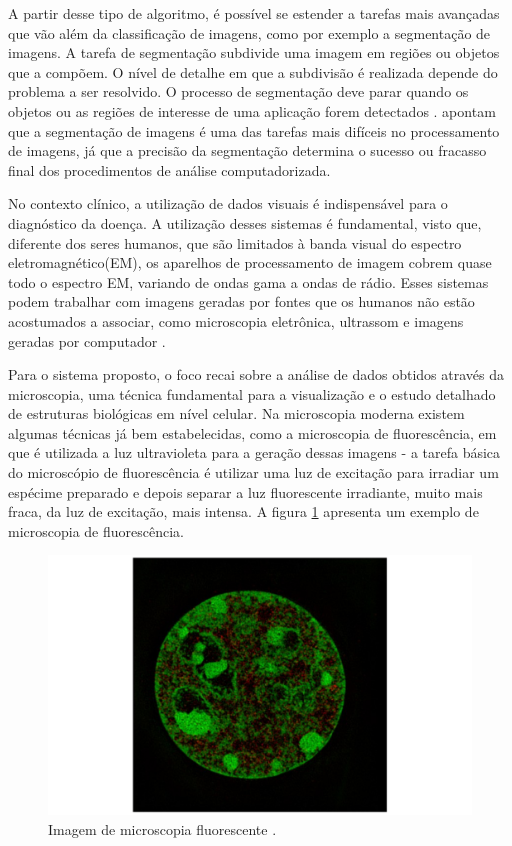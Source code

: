 A partir desse tipo de algoritmo, é possível se estender a tarefas mais avançadas que vão além da classificação de imagens, como por exemplo a segmentação de imagens. A tarefa de segmentação subdivide uma imagem em regiões ou objetos que a compõem. O nível de detalhe em que a subdivisão é realizada depende do problema a ser resolvido. O processo de segmentação deve parar quando os objetos ou as regiões de interesse de uma aplicação forem detectados \cite{gonzalez2008digital}.  apontam que a segmentação de imagens é uma das tarefas mais difíceis no processamento de imagens, já que a precisão da segmentação determina o sucesso ou fracasso final dos procedimentos de análise computadorizada.

No contexto clínico, a utilização de dados visuais é indispensável para o diagnóstico da doença. A utilização desses sistemas é fundamental, visto que, diferente dos seres humanos, que são limitados à banda visual do espectro eletromagnético(EM), os aparelhos de processamento de imagem cobrem quase todo o espectro EM, variando de ondas gama a ondas de rádio. Esses sistemas podem trabalhar com imagens geradas por fontes que os humanos não estão acostumados a associar, como microscopia eletrônica, ultrassom e imagens geradas por computador \cite{gonzalez2008digital}.

Para o sistema proposto, o foco recai sobre a análise de dados obtidos através da microscopia, uma técnica fundamental para a visualização e o estudo detalhado de estruturas biológicas em nível celular. Na microscopia moderna existem algumas técnicas já bem estabelecidas, como a microscopia de fluorescência, em que é utilizada a luz ultravioleta para a geração dessas imagens - a tarefa básica do microscópio de fluorescência é utilizar uma luz de excitação para irradiar um espécime preparado e depois separar a luz fluorescente irradiante, muito mais fraca, da luz de excitação, mais intensa. A figura \ref{fig: fluomicro} apresenta um exemplo de microscopia de fluorescência. 

\begin{figure}[h]
  \centering\includegraphics[scale=0.18]{images/fluo-micro.png} 
  \caption{Imagem de microscopia fluorescente \cite{fluo-micro}.}
\label{fig: fluomicro}
\end{figure}

